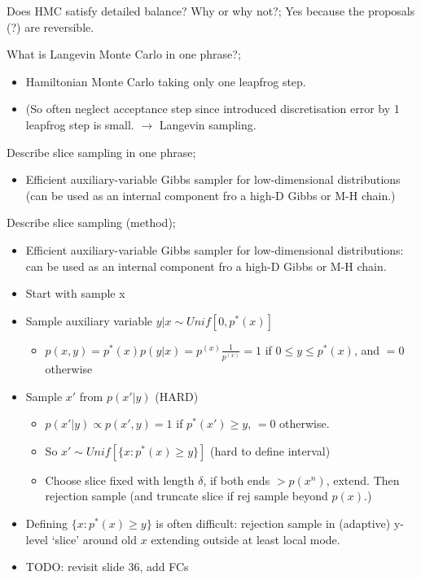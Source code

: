 \documentclass{article}
\begin{document}
Does HMC satisfy detailed balance? Why or why not?; Yes because the proposals (?) are reversible.

What is Langevin Monte Carlo in one phrase?; \begin{itemize} \item Hamiltonian Monte Carlo taking only one leapfrog step. \item (So often neglect acceptance step since introduced discretisation error by 1 leapfrog step is small. $\to$ Langevin sampling. \end{itemize}  

Describe slice sampling in one phrase; \begin{itemize} \item Efficient auxiliary-variable Gibbs sampler for low-dimensional distributions (can be used as an internal component fro a high-D Gibbs or M-H chain.) \end{itemize}

Describe slice sampling (method); \begin{itemize} \item Efficient auxiliary-variable Gibbs sampler for low-dimensional distributions: can be used as an internal component fro a high-D Gibbs or M-H chain. \item Start with sample x \item Sample auxiliary variable $y|x \sim Unif[0, p^*(x)]$ \begin{itemize} \item $p(x, y) = p^*(x)p(y|x) = p^(x)\frac{1}{p^(x)}=1$ if $0\leq y \leq p^*(x)$, and $=0$ otherwise \end{itemize} \item Sample $x'$ from $p(x'|y)$ (HARD) \begin{itemize} \item $p(x'|y) \propto p(x',y) = 1$ if $p^*(x') \geq y$, $=0$ otherwise. \item So $x' \sim Unif[\{x: p^*(x) \geq y\} ]$ (hard to define interval) \item Choose slice fixed with length $\delta$, if both ends $> p(x^n)$, extend. Then rejection sample (and truncate slice if rej sample beyond $p(x)$.) \end{itemize} \item Defining $\{x:p^*(x)\geq y \}$ is often difficult: rejection sample in (adaptive) y-level `slice' around old $x$ extending outside at least local mode. \item TODO: revisit slide 36, add FCs \end{itemize}
\end{document}
